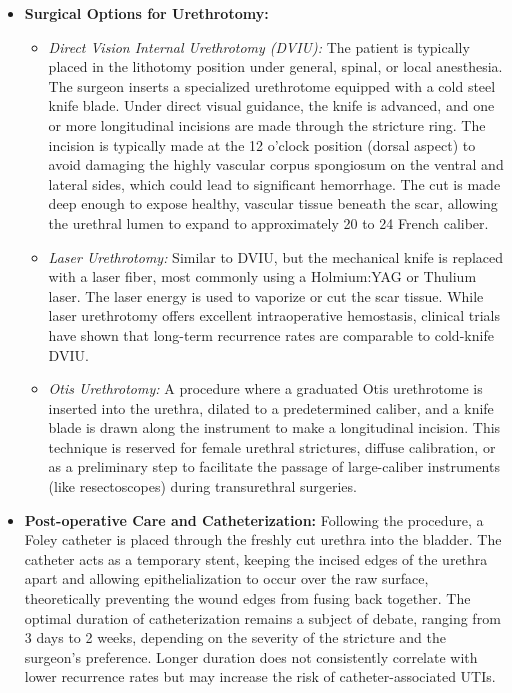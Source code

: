 \begin{itemize}
  \item \textbf{Surgical Options for Urethrotomy:}
  \begin{itemize}
    \item \textit{Direct Vision Internal Urethrotomy (DVIU):} The patient is typically placed in the lithotomy position under general, spinal, or local anesthesia. The surgeon inserts a specialized urethrotome equipped with a cold steel knife blade. Under direct visual guidance, the knife is advanced, and one or more longitudinal incisions are made through the stricture ring. The incision is typically made at the 12 o'clock position (dorsal aspect) to avoid damaging the highly vascular corpus spongiosum on the ventral and lateral sides, which could lead to significant hemorrhage. The cut is made deep enough to expose healthy, vascular tissue beneath the scar, allowing the urethral lumen to expand to approximately 20 to 24 French caliber.
    \item \textit{Laser Urethrotomy:} Similar to DVIU, but the mechanical knife is replaced with a laser fiber, most commonly using a Holmium:YAG or Thulium laser. The laser energy is used to vaporize or cut the scar tissue. While laser urethrotomy offers excellent intraoperative hemostasis, clinical trials have shown that long-term recurrence rates are comparable to cold-knife DVIU.
    \item \textit{Otis Urethrotomy:} A procedure where a graduated Otis urethrotome is inserted into the urethra, dilated to a predetermined caliber, and a knife blade is drawn along the instrument to make a longitudinal incision. This technique is reserved for female urethral strictures, diffuse calibration, or as a preliminary step to facilitate the passage of large-caliber instruments (like resectoscopes) during transurethral surgeries.
  \end{itemize}
  \item \textbf{Post-operative Care and Catheterization:} Following the procedure, a Foley catheter is placed through the freshly cut urethra into the bladder. The catheter acts as a temporary stent, keeping the incised edges of the urethra apart and allowing epithelialization to occur over the raw surface, theoretically preventing the wound edges from fusing back together. The optimal duration of catheterization remains a subject of debate, ranging from 3 days to 2 weeks, depending on the severity of the stricture and the surgeon's preference. Longer duration does not consistently correlate with lower recurrence rates but may increase the risk of catheter-associated UTIs.

\end{itemize}
